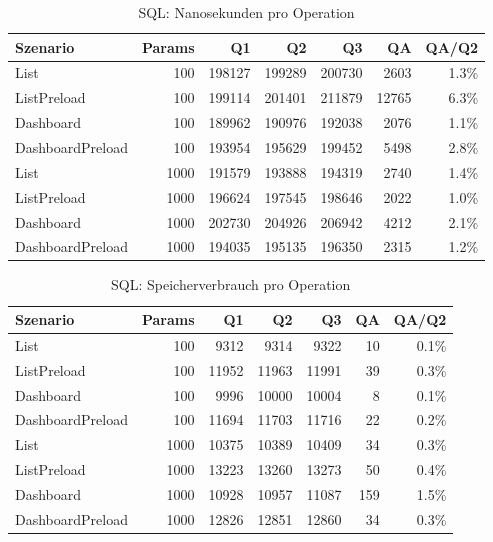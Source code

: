 
\begin{table}[ht]
\caption{SQL: Nanosekunden pro Operation}
\begin{tabular}{lrrrrrr}
\toprule
Szenario & Params & Q1 & Q2 & Q3 & QA & QA/Q2 \\
\midrule
	List & 100 & 198127 & 199289 & 200730 & 2603 & 1.3\% \\
	ListPreload & 100 & 199114 & 201401 & 211879 & 12765 & 6.3\% \\
	Dashboard & 100 & 189962 & 190976 & 192038 & 2076 & 1.1\% \\
	DashboardPreload & 100 & 193954 & 195629 & 199452 & 5498 & 2.8\% \\
	List & 1000 & 191579 & 193888 & 194319 & 2740 & 1.4\% \\
	ListPreload & 1000 & 196624 & 197545 & 198646 & 2022 & 1.0\% \\
	Dashboard & 1000 & 202730 & 204926 & 206942 & 4212 & 2.1\% \\
	DashboardPreload & 1000 & 194035 & 195135 & 196350 & 2315 & 1.2\% \\
\bottomrule
\end{tabular}
\label{tab:benchmark_sql_nsperop}
\end{table}
	
\begin{table}[ht]
\caption{SQL: Speicherverbrauch pro Operation}
\begin{tabular}{lrrrrrr}
\toprule
Szenario & Params & Q1 & Q2 & Q3 & QA & QA/Q2 \\
\midrule
	List & 100 & 9312 & 9314 & 9322 & 10 & 0.1\% \\
	ListPreload & 100 & 11952 & 11963 & 11991 & 39 & 0.3\% \\
	Dashboard & 100 & 9996 & 10000 & 10004 & 8 & 0.1\% \\
	DashboardPreload & 100 & 11694 & 11703 & 11716 & 22 & 0.2\% \\
	List & 1000 & 10375 & 10389 & 10409 & 34 & 0.3\% \\
	ListPreload & 1000 & 13223 & 13260 & 13273 & 50 & 0.4\% \\
	Dashboard & 1000 & 10928 & 10957 & 11087 & 159 & 1.5\% \\
	DashboardPreload & 1000 & 12826 & 12851 & 12860 & 34 & 0.3\% \\
\bottomrule
\end{tabular}
\label{tab:benchmark_sql_bytesperop}
\end{table}
	
